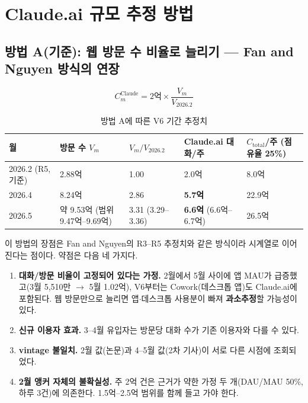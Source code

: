 \documentclass[11pt]{article}
\begin{document}
\section{Claude.ai 규모 추정 방법}

\subsection{방법 A(기준): 웹 방문 수 비율로 늘리기 --- Fan and Nguyen 방식의 연장}

\begin{equation*}
C^{\text{Claude}}_m = 2\text{억} \times \frac{V_m}{V_{2026.2}}
\end{equation*}

\begin{longtable}{L{2.8cm}L{3.4cm}L{2.6cm}L{2.8cm}L{3.0cm}}
\caption{방법 A에 따른 V6 기간 추정치}\label{tab:methodA}\\
\toprule
월 & 방문 수 $V_m$ & $V_m/V_{2026.2}$ & Claude.ai 대화/주 & $C_{\text{total}}$/주 (점유율 25\%) \\
\midrule
{} (R5, 기준) & 2.88억 & 1.00 & 2.0억 & 8.0억 \\
2026.4 & 8.24억 & 2.86 & \textbf{5.7억} & 22.9억 \\
2026.5 & 약 9.53억 (범위 9.47억--9.69억) & 3.31 (3.29--3.36) & \textbf{6.6억} (6.6억--6.7억) & 26.5억 \\
\bottomrule
\end{longtable}

이 방법의 장점은 Fan and Nguyen의 R3--R5 추정치와 같은 방식이라 시계열로 이어진다는 점이다. 약점은 다음 네 가지다.
\begin{enumerate}[label=(\arabic*)]
  \item \textbf{대화/방문 비율이 고정되어 있다는 가정.} 2월에서 5월 사이에 앱 MAU가 급증했고(3월 5,510만 $\to$ 5월 1.02억), V6부터는 Cowork(데스크톱 앱)도 Claude.ai에 포함된다. 웹 방문만으로 늘리면 앱$\cdot$데스크톱 사용분이 빠져 \textbf{과소추정}할 가능성이 있다.
  \item \textbf{신규 이용자 효과.} 3--4월 유입자는 방문당 대화 수가 기존 이용자와 다를 수 있다.
  \item \textbf{vintage 불일치.} 2월 값(논문)과 4--5월 값(2차 기사)이 서로 다른 시점에 조회되었다.
  \item \textbf{2월 앵커 자체의 불확실성.} 주 2억 건은 근거가 약한 가정 두 개(DAU/MAU 50\%, 하루 3건)에 의존한다. 1.5억--2.5억 범위를 함께 들고 가야 한다.
\end{enumerate}
\end{document}
